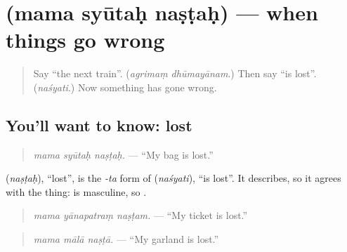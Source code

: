 \section[\texorpdfstring{\sk{मम} \sk{स्यूतः} \sk{नष्टः} (mama syūtaḥ naṣṭaḥ)}{मम स्यूतः नष्टः (mama syūtaḥ naṣṭaḥ)}]{   (mama syūtaḥ naṣṭaḥ) — when things go wrong}

\label{lesson:SA-C281-mama-syutah-nastah}



\begin{quote}
Say \textquotedblleft{}the next train\textquotedblright{}. (\emph{agrimaṃ dhūmayānam}.) Then say \textquotedblleft{}is lost\textquotedblright{}. (\emph{naśyati}.) Now something has gone wrong.
\end{quote}

\subsection*{You'll want to know: lost}
\begin{quote}
\textbf{  }
\end{quote}

\begin{quote}
\emph{mama syūtaḥ naṣṭaḥ.} — \textquotedblleft{}My bag is lost.\textquotedblright{}
\end{quote}

\textbf{} (\emph{naṣṭaḥ}), \textquotedblleft{}lost\textquotedblright{}, is the \emph{-ta} form of \textbf{} (\emph{naśyati}), \textquotedblleft{}is lost\textquotedblright{}. It describes, so it agrees with the thing: \textbf{} is masculine, so \textbf{}.

\begin{quote}
\textbf{  }
\end{quote}

\begin{quote}
\emph{mama yānapatraṃ naṣṭam.} — \textquotedblleft{}My ticket is lost.\textquotedblright{}
\end{quote}

\begin{quote}
\textbf{  }
\end{quote}

\begin{quote}
\emph{mama mālā naṣṭā.} — \textquotedblleft{}My garland is lost.\textquotedblright{}
\end{quote}

